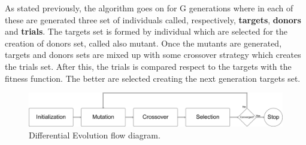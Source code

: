 As stated previously, the algorithm goes on for G generations where in each of these are generated three set of individuals called, respectively, \textbf{targets}, \textbf{donors} and \textbf{trials}. The targets set is formed by individual which are selected for the creation of donors set, called also mutant. Once the mutants are generated, targets and donors sets are mixed up with some crossover strategy which creates the trials set. After this, the trials is compared respect to the targets with the fitness function. The better are selected creating the next generation targets set. \\

\begin{figure}[t]
	\centering
	\includegraphics[width=\textwidth]{figures/de-flow.png}
	\caption{Differential Evolution flow diagram.}
\end{figure}

